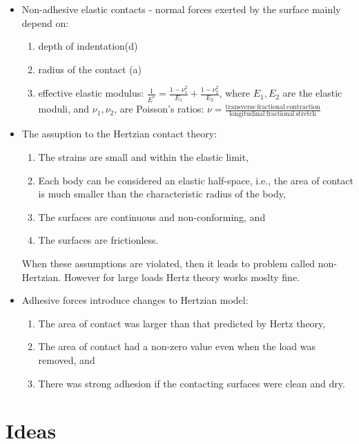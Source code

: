 \documentclass[10pt,a4paper]{article}
\begin{document}
\begin{itemize}
 \item Non-adhesive elastic contacts - normal forces exerted by the surface mainly depend on:
 \begin{enumerate}
  \item depth of indentation(d)
  \item radius of the contact (a)
  \item effective elastic modulus: $\frac{1}{E^{*}} = \frac{1-\nu_1^2}{E_1}+\frac{1-\nu_2^2}{E_2}$, where $E_1,E_2$ are the elastic moduli,
  and $\nu_1,\nu_2$, are Poisson's ratios:
  $\nu = \frac{\mathrm{transverse ~ fractional ~ contraction}}{\mathrm{longitudinal ~ fractional ~ stretch}}$
 \end{enumerate}
 \item The assuption to the Hertzian contact theory:
 \begin{enumerate}
  \item The strains are small and within the elastic limit,
  \item Each body can be considered an elastic half-space, i.e., the area of contact is much smaller than the characteristic radius of the body,
  \item The surfaces are continuous and non-conforming, and
  \item The surfaces are frictionless.
 \end{enumerate}
 When these assumptions are violated, then it leads to problem called non-Hertzian. 
 However for large loads Hertz theory works moslty fine.
 
 \item Adhesive forces introduce changes to Hertzian model:
 \begin{enumerate}
  \item The area of contact was larger than that predicted by Hertz theory,
  \item The area of contact had a non-zero value even when the load was removed, and
  \item There was strong adhesion if the contacting surfaces were clean and dry.

 \end{enumerate}



\end{itemize}



\section{Ideas}
\end{document}
